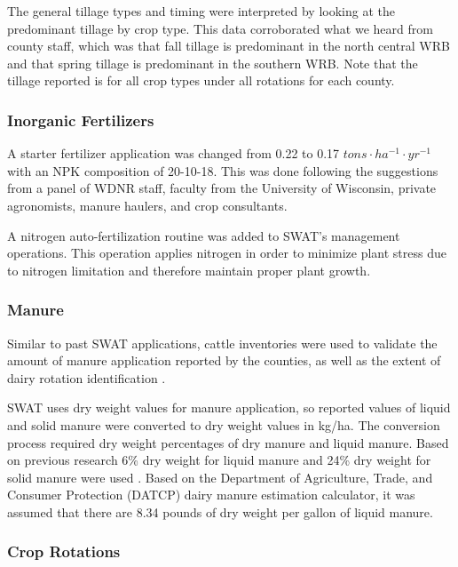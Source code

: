 The general tillage types and timing were interpreted by looking at the predominant tillage by
crop type. This data corroborated what we heard from county staff, which was that
fall tillage is predominant in the north central WRB and that spring tillage is predominant in the
southern WRB. Note that the tillage reported is for all crop types under all rotations for each county.

\subsubsection{Inorganic Fertilizers}

A starter fertilizer application was changed from 0.22 to 0.17 $tons \cdot ha^{-1} \cdot yr^{-1}$ with an NPK composition of 20-10-18. This was done following the suggestions from a panel of WDNR staff, faculty from the University of Wisconsin, private agronomists, manure haulers, and crop consultants.

A nitrogen auto-fertilization routine was added to SWAT's management operations. 
This operation applies nitrogen in order to minimize plant stress due to nitrogen limitation and therefore maintain proper plant growth.

\subsubsection{Manure}

Similar to past SWAT applications, cattle inventories were used to validate the amount of manure application reported by the counties, as well as the extent of dairy rotation identification \citep{baumgart_source_2005, freihoefer_mead_2007, timm_swat_2011}.

SWAT uses dry weight values for manure application, so reported values of liquid and solid manure were converted to dry weight values in kg/ha. The conversion process required dry weight percentages of dry manure and liquid manure. Based on previous research 6\% dry weight for liquid manure and 24\% dry weight for solid manure were used . Based on the Department of Agriculture, Trade, and Consumer Protection (DATCP) dairy manure estimation calculator, it was assumed that there are 8.34 pounds of dry weight per gallon of liquid manure.

\subsubsection{Crop Rotations}


